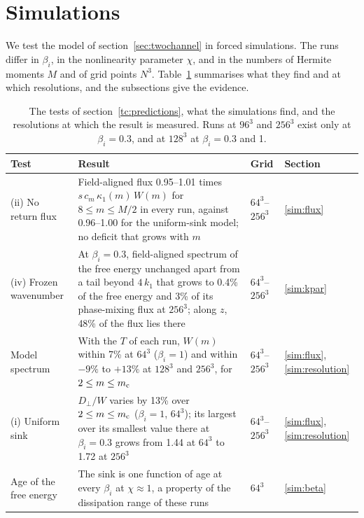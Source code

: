 \section{Simulations}\label{sec:simulations}

We test the model of section~\ref{sec:twochannel} in forced simulations. The runs differ in $\beta_i$, in the nonlinearity parameter $\chi$, and in the numbers of Hermite moments $M$ and of grid points $N^3$. Table~\ref{tab:scorecard} summarises what they find and at which resolutions, and the subsections give the evidence.

\begin{table}[!ht]
  \centering
  \caption{The tests of section~\ref{tc:predictions}, what the simulations find, and the resolutions at which the result is measured. Runs at $96^3$ and $256^3$ exist only at $\beta_i=0.3$, and at $128^3$ at $\beta_i=0.3$ and 1.}
  \label{tab:scorecard}
  \begin{tabular}{>{\raggedright\arraybackslash}p{3.1cm}>{\raggedright\arraybackslash}p{8.9cm}>{\raggedright\arraybackslash}p{1.6cm}l}
    \toprule
    Test & Result & Grid & Section \\
    \midrule
    (ii) No return flux & Field-aligned flux 0.95--1.01 times $s\,c_m\,\kappa_1(m)\,W(m)$ for $8\le m\le M/2$ in every run, against 0.96--1.00 for the uniform-sink model; no deficit that grows with $m$ & $64^3$--$256^3$ & \ref{sim:flux} \\
    (iv) Frozen wavenumber & At $\beta_i=0.3$, field-aligned spectrum of the free energy unchanged apart from a tail beyond $4\,k_1$ that grows to 0.4\% of the free energy and 3\% of its phase-mixing flux at $256^3$; along $z$, 48\% of the flux lies there & $64^3$--$256^3$ & \ref{sim:kpar} \\
    Model spectrum & With the $T$ of each run, $W(m)$ within 7\% at $64^3$ ($\beta_i=1$) and within $-9\%$ to $+13\%$ at $128^3$ and $256^3$, for $2\le m\le m_{\rm c}$ & $64^3$--$256^3$ & \ref{sim:flux}, \ref{sim:resolution} \\
    (i) Uniform sink & $D_\perp/W$ varies by 13\% over $2\le m\le m_{\rm c}$ ($\beta_i=1$, $64^3$); its largest over its smallest value there at $\beta_i=0.3$ grows from 1.44 at $64^3$ to 1.72 at $256^3$ & $64^3$--$256^3$ & \ref{sim:flux}, \ref{sim:resolution} \\
    Age of the free energy & The sink is one function of age at every $\beta_i$ at $\chi\approx1$, a property of the dissipation range of these runs & $64^3$ & \ref{sim:beta} \\

\end{tabular}
\end{table}
